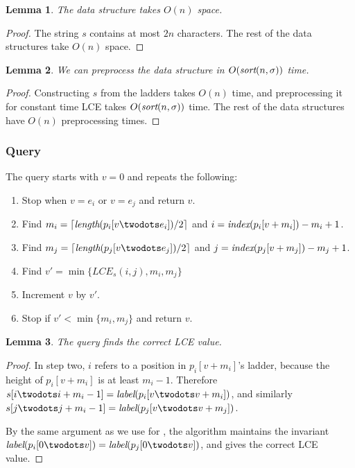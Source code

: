 \documentclass[a4]{article}
\newtheorem{lemma}{Lemma}
\begin{document}
\begin{lemma}
The  data structure takes $O(n)$ space.
\end{lemma}
\begin{proof}
The string $s$ contains at most $2n$ characters. The rest of the data structures take $O(n)$ space.
\end{proof}

\begin{lemma}
We can preprocess the  data structure in $O(\textit{sort}(n,\sigma))$ time.
\end{lemma}
\begin{proof}
Constructing $s$ from the ladders takes $O(n)$ time, and preprocessing it for constant time LCE takes $O(\textit{sort}(n,\sigma))$ time. The rest of the data structures have $O(n)$ preprocessing times.
\end{proof}

\subsubsection{Query}

The  query starts with $v=0$ and repeats the following:
\begin{enumerate}
\item Stop when $v = e_i$ or $v = e_j$ and return $v$.
\item Find $m_i = \lceil\zlength(p_i[v\twodots e_i])/2\rceil$ and $i = \textit{index}(p_i[v+m_i]) - m_i + 1$.
\item Find $m_j = \lceil\zlength(p_j[v\twodots e_j])/2\rceil$ and $j = \textit{index}(p_j[v+m_j]) - m_j + 1$.
\item Find $v' = \min\{LCE_s(i,j),m_i,m_j\}$
\item Increment $v$ by $v'$.
\item Stop if $v' < \min\{m_i,m_j\}$ and return $v$.
\end{enumerate}

\begin{lemma}
The  query finds the correct LCE value.
\end{lemma}
\begin{proof}
In step two, $i$ refers to a position in $p_i[v+m_i]$'s ladder, because the height of $p_i[v+m_i]$ is at least $m_i-1$. Therefore $s[i\twodots i+m_i-1] = \zlabel(p_i[v\twodots v+m_i])$, and similarly $s[j\twodots j+m_i-1] = \zlabel(p_j[v\twodots v+m_j])$.

By the same argument as we use for , the algorithm maintains the invariant $\zlabel(p_i[0\twodots v])=\zlabel(p_j[0\twodots v])$, and gives the correct LCE value.
\end{proof}
\end{document}
